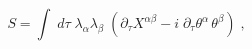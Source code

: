 \begin{equation}\label{1}
S=\int\;d\tau\;\lambda_\alpha\lambda_\beta\;(\partial_\tau
X^{\alpha\beta}-i\; \partial_\tau\theta^\alpha\,\theta^\beta)\;,
\end{equation}

